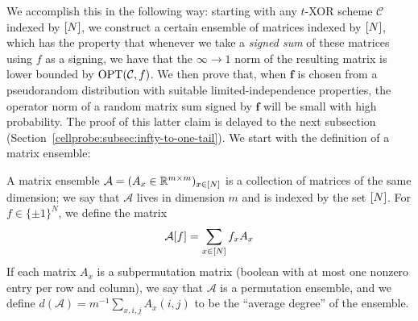 We accomplish this in the following way: starting with any $t$-XOR scheme $\mathcal{C}$ indexed by $[N]$, we construct a certain ensemble of matrices indexed by $[N]$, which has the property that whenever we take a \emph{signed sum} of these matrices using $f$ as a signing, we have that the $\infty\to1$ norm of the resulting matrix is lower bounded by $\mathrm{OPT}(\mathcal{C},f)$. We then prove that, when $\bm{f}$ is chosen from a pseudorandom distribution with suitable limited-independence properties, the operator norm of a random matrix sum signed by $\bm{f}$ will be small with high probability. The proof of this latter claim is delayed to the next subsection (Section~\ref{cellprobe:subsec:infty-to-one-tail}).
We start with the definition of a matrix ensemble: 
\begin{definition}
A matrix ensemble $\mathcal{A} = (A_x\in \mathbb{R}^{m \times m})_{x \in [N]}$ is a collection of matrices of the same dimension; we say that $\mathcal{A}$ lives in dimension $m$ and is indexed by the set $[N]$. For $f\in \{\pm 1\}^N$, we define the matrix
\[
\mathcal{A}[f] = \sum_{x\in [N]} f_x A_x
\]
If each matrix $A_x$ is a subpermutation matrix (boolean with at most one nonzero entry per row and column), we say that $\mathcal{A}$ is a permutation ensemble, and we define $d(\mathcal{A})= m^{-1} \sum_{x,i,j}A_x(i,j)$ to be the ``average degree'' of the ensemble.
\end{definition}

